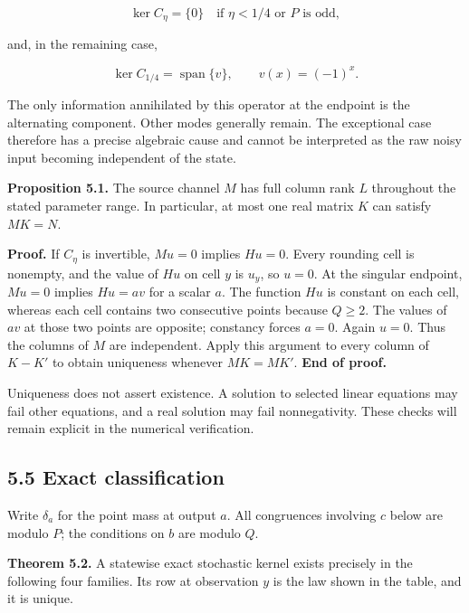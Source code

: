 \documentclass[
]{article}
\begin{document}
\[
\ker C_\eta=\{0\}
\quad\text{if }\eta<1/4\text{ or }P\text{ is odd},
\]

and, in the remaining case,

\[
\ker C_{1/4}=\operatorname{span}\{v\},
\qquad v(x)=(-1)^x.
\]

The only information annihilated by this operator at the endpoint is the
alternating component. Other modes generally remain. The exceptional
case therefore has a precise algebraic cause and cannot be interpreted
as the raw noisy input becoming independent of the state.

\textbf{Proposition 5.1.} The source channel \(M\) has full column rank
\(L\) throughout the stated parameter range. In particular, at most one
real matrix \(K\) can satisfy \(MK=N\).

\textbf{Proof.} If \(C_\eta\) is invertible, \(Mu=0\) implies \(Hu=0\).
Every rounding cell is nonempty, and the value of \(Hu\) on cell \(y\)
is \(u_y\), so \(u=0\). At the singular endpoint, \(Mu=0\) implies
\(Hu=av\) for a scalar \(a\). The function \(Hu\) is constant on each
cell, whereas each cell contains two consecutive points because
\(Q\ge2\). The values of \(av\) at those two points are opposite;
constancy forces \(a=0\). Again \(u=0\). Thus the columns of \(M\) are
independent. Apply this argument to every column of \(K-K'\) to obtain
uniqueness whenever \(MK=MK'\). \textbf{End of proof.}

Uniqueness does not assert existence. A solution to selected linear
equations may fail other equations, and a real solution may fail
nonnegativity. These checks will remain explicit in the numerical
verification.

\subsection{5.5 Exact classification}\label{exact-classification}

Write \(\delta_a\) for the point mass at output \(a\). All congruences
involving \(c\) below are modulo \(P\); the conditions on \(b\) are
modulo \(Q\).

\textbf{Theorem 5.2.} A statewise exact stochastic kernel exists
precisely in the following four families. Its row at observation \(y\)
is the law shown in the table, and it is unique.
\end{document}
